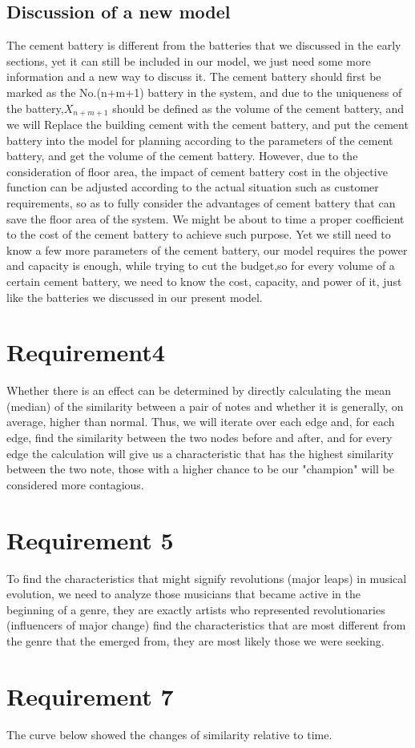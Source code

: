 \documentclass{article}
\begin{document}
\subsection{Discussion of a new model}
The cement battery is different from the batteries that we discussed in the early sections, yet it can still be included in our model, we just need  some more information and a new way to discuss it.
The cement battery should first be marked as the No.(n+m+1) battery in the system, and due to the uniqueness of the battery,$X_{n+m+1}$ should be defined as the volume of the cement battery, and we will Replace the building cement with the cement battery, and
put the cement battery into the model for planning according to the parameters of the cement battery, and get the volume of the cement battery. However, due to the consideration of
floor area, the impact of cement battery cost in the objective function can be adjusted according to the actual situation such as customer requirements, so as to fully consider the advantages of
cement battery that can save the floor area of the system. We might be about to time a proper coefficient to the cost of the cement battery to achieve such purpose. Yet we still need to know a few more parameters of the cement battery, our model requires the power and capacity is enough, while trying to cut the budget,so for every volume of a certain cement battery, we need to know the cost, capacity, and power of it,
just like the batteries we discussed in our present model.
\section{Requirement4}\Large
Whether there is an effect can be determined by directly calculating the mean (median) of the similarity between a pair  of notes and whether it is generally,
on average, higher than normal. Thus, we will iterate over each edge and, for each edge, find the similarity between the two nodes before and after, and for every
edge the calculation will give us a characteristic that has the highest similarity between the two note, those with a higher chance to be our "champion" will be considered
more contagious.
\section{Requirement 5}
To find the characteristics that might signify revolutions (major leaps) in musical evolution, we need to analyze those musicians that became active in the beginning of
a genre, they are exactly artists who represented revolutionaries (influencers of major
change) find the characteristics that are most different from the genre that the emerged from, they are most likely those we were seeking.
\section{Requirement 7}
The curve below showed the changes of similarity relative to time.
\end{document}
